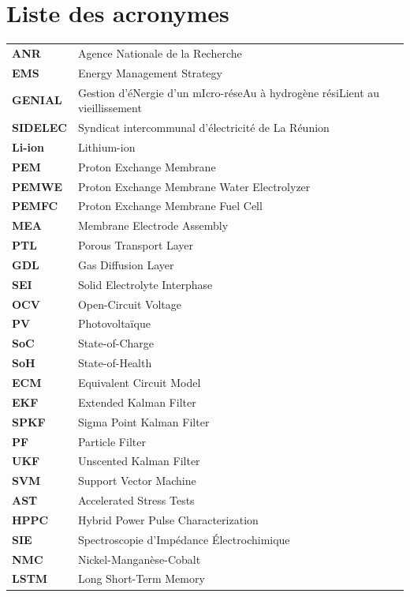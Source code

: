 \documentclass[a4paper,french,12pt,twoside,openright]{book}
\begin{document}
\chapter*{Liste des acronymes}
\noindent
\begin{longtable}{ll}
\textbf{ANR}    & Agence Nationale de la Recherche \\
\textbf{EMS}    & Energy Management Strategy \\
\textbf{GENIAL} & Gestion d'éNergie d'un mIcro-réseAu à hydrogène résiLient au vieillissement \\
\textbf{SIDELEC} & Syndicat intercommunal d'électricité de La Réunion \\
\textbf{Li-ion} & Lithium-ion \\
\textbf{PEM}    & Proton Exchange Membrane \\
\textbf{PEMWE}  & Proton Exchange Membrane Water Electrolyzer  \\
\textbf{PEMFC}  & Proton Exchange Membrane Fuel Cell  \\
\textbf{MEA}    & Membrane Electrode Assembly \\
\textbf{PTL}    & Porous Transport Layer \\
\textbf{GDL}    & Gas Diffusion Layer \\
\textbf{SEI}    & Solid Electrolyte Interphase \\
\textbf{OCV}    & Open-Circuit Voltage \\
\textbf{PV}     & Photovoltaïque \\
\textbf{SoC}    & State-of-Charge  \\
\textbf{SoH}    & State-of-Health  \\
\textbf{ECM}    & Equivalent Circuit Model \\
\textbf{EKF}    & Extended Kalman Filter \\
\textbf{SPKF}   & Sigma Point Kalman Filter \\
\textbf{PF}     & Particle Filter \\
\textbf{UKF}    & Unscented Kalman Filter \\
\textbf{SVM}    & Support Vector Machine \\
\textbf{AST}    & Accelerated Stress Tests \\
\textbf{HPPC}   & Hybrid Power Pulse Characterization \\
\textbf{SIE}    & Spectroscopie d'Impédance Électrochimique \\
\textbf{NMC}    & Nickel-Manganèse-Cobalt \\
\textbf{LSTM}   & Long Short-Term Memory \\

\end{longtable}
\end{document}
